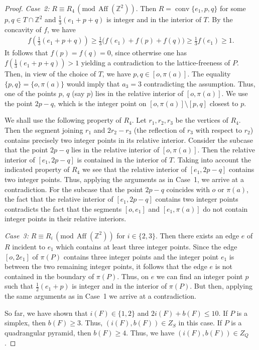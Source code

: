 \documentclass[a4paper]{article}
\theoremstyle{plain}
\begin{document}
\begin{proof}
\emph{Case~2:} $R \equiv R_4 {\, (\mathrm{mod} \, {{{\mathop{\mathrm{{Aff}}}}}({\mathbb{Z}}^2)})}$.
Then $R= {{\mathop{\mathrm{{conv}}}}} \{e_1, p, q\}$ for some $p, q \in T \cap
{\mathbb{Z}}^2$ and $\frac{1}{3}(e_1 + p + q)$ is integer and
in the interior of $T$.
By the concavity of $f$, we have 
\begin{align*}
f \left( \frac{1}{3} (e_1 + p + q) \right) \ge \frac{1}{3}
\Big( f(e_1) + f(p) + f(q) \Big) \ge \frac{1}{3} f(e_1) \ge
1.
\end{align*}
It follows that $f(p)=f(q)=0$, since otherwise one has $f \left( \frac{1}{3} (e_1 + p + q) \right) > 1$ yielding 
a contradiction to the lattice-freeness of $P$. Then, in view of the choice of $T$, we have $p, q \in [o,\pi(a)]$. The equality $\{p,q\} = \{o,\pi(a)\}$ would imply that $a_3=3$ contradicting the assumption. Thus, one of the points $p$, $q$ (say $p$) lies in the relative interior of $[o,\pi(a)]$. We use the point $2p-q$, which is the integer point on $[o,\pi(a)] \setminus [p,q]$ closest to $p$. 

We shall use the following property of $R_4$.
Let $r_1, r_2, r_3$ be the vertices of $R_4$.
Then the segment joining $r_1$ and $2 r_2 - r_3$ (the
reflection of $r_3$ with respect to $r_2$) contains
precisely two integer points in its relative interior.
Consider the subcase that the point $2p -q$ lies in the
relative interior of $[o,\pi(a)]$.
Then the relative interior of $[e_1,2p-q]$ is contained in
the interior of $T$.
Taking into account the indicated property of $R_4$ we see
that the relative interior of $[e_1,2p-q]$ contains two
integer points.
Thus, applying the arguments as in Case~1, we arrive at a
contradiction.
For the subcase that the point $2p -q$ coincides with $o$ or
$\pi(a)$, the fact that the relative interior of
$[e_1,2p-q]$ contains two integer points contradicts the
fact that the segments $[o,e_1]$ and $[e_1,\pi(a)]$ do not
contain integer points in their relative interiors.

\emph{Case~3:} $R \equiv R_i {\, (\mathrm{mod} \, {{{\mathop{\mathrm{{Aff}}}}}({\mathbb{Z}}^2)})}$ for
$i \in \{2,3\}$.
Then there exists an edge $e$ of $R$ incident to $e_1$ which
contains at least three integer points.
Since the edge $[o,2e_1]$ of $\pi(P)$ contains three integer
points and the integer point $e_1$ is between the two
remaining integer points, it follows that the edge $e$ is
not contained in the boundary of $\pi(P)$.
Thus, on $e$ we can find an integer point $p$ such that
$\frac{1}{2}(e_1 + p)$ is integer and in the interior of
$\pi(P)$.
But then, applying the same arguments as in Case~1 we
arrive at a contradiction.

So far, we have shown that $i(F) \in \{1,2\}$ and $2 i(F) +
b(F) \le 10$. 
If $P$ is a simplex, then $b(F) \geq 3$.
Thus, $(i(F),b(F)) \in Z_S$ in this case.
If $P$ is a quadrangular pyramid, then $b(F) \geq 4$.
Thus, we have $(i(F),b(F)) \in Z_Q$.
\end{proof}
\end{document}
